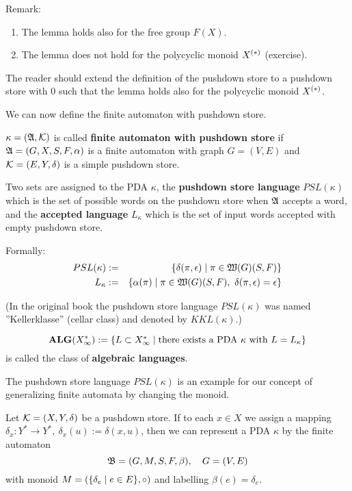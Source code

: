 Remark:
\begin{enumerate}
  \item The lemma holds also for the free group $F(X)$.
  \item The lemma does not hold for the polycyclic monoid $\mbox{${X}^{(*)}$}$
  (exercise).
\end{enumerate}

The reader should extend the definition of the pushdown store to a
pushdown store with 0 such that the lemma holds also for the polycyclic monoid
$\mbox{${X}^{(*)}$}$.

We can now define the finite automaton with pushdown store.

\begin{definition}
$\kappa = (\mbox{$\mathfrak{A}$}, \mbox{$\mathcal{K}$})$ is called {\bf finite automaton with
pushdown store} if $\mbox{$\mathfrak{A}$} = (G, X, S, F, \alpha)$ is a finite automaton with
graph $G = (V, E)$ and $\mbox{$\mathcal{K}$} = (E, Y,\delta)$ is a simple pushdown store.
\end{definition}

Two sets are assigned to the PDA $\kappa$, the {\bf pushdown store language}
$PSL(\kappa)$ which is the set of possible words on the pushdown store when
$\mbox{$\mathfrak{A}$}$ accepts a word, and the {\bf accepted language} $L_\kappa$ which is the set of
 input words accepted with empty pushdown store.

Formally:
\begin{eqnarray*}
PSL(\kappa) &:=& \mbox{$\{\delta(\pi, \epsilon) \mid \pi \in \mbox{$\mathfrak{W}({G})$}(S, F)\}$}\\
L_\kappa &:=& \mbox{$\{\alpha(\pi) \mid \pi \in \mbox{$\mathfrak{W}({G})$}(S, F),\ \delta(\pi,
\epsilon) = \epsilon\}$}
\end{eqnarray*}

(In the original book the pushdown store language $PSL(\kappa)$ was
named ''Kellerklasse'' (cellar class) and denoted by $KKL(\kappa)$.)

\begin{definition}
\[ \mbox{{\bf ALG}}(X_\infty^*) := \mbox{$\{L \subset X_\infty^* \mid \text{there exists a PDA
$\kappa$ with $L = L_\kappa$}\}$}
\]
is called the class of {\bf algebraic languages}.
\end{definition}

The pushdown store language $PSL(\kappa)$ is an example for our concept of
generalizing finite automata by changing the monoid. 

Let $\mbox{$\mathcal{K}$}=(X, Y, \delta)$ be a pushdown store. If to each $x\in X$ we
assign a mapping $\delta_x: Y^* \to Y^*,\ \delta_x(u) := \delta(x, u)$, then we can 
represent a PDA $\kappa$ by the finite automaton
\[ \mbox{$\mathfrak{B}$} = (G, M, S, F, \beta),\quad G=(V,E) \]
with monoid $M = (\mbox{$\{\delta_e \mid e\in E\}$}, \circ)$ and labelling $\beta(e)
= \delta_e$.

